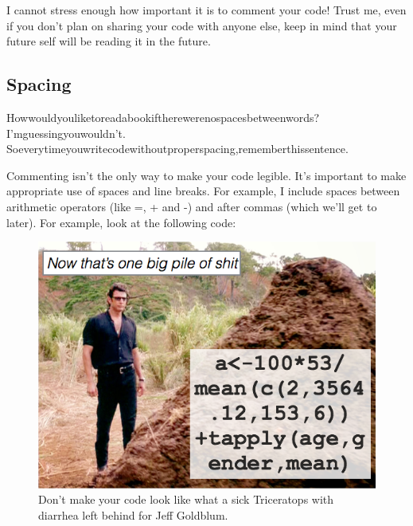 \documentclass[
]{book}
\newenvironment{Shaded}{\begin{snugshade}}{\end{snugshade}}
\newcommand{\AttributeTok}[1]{\textcolor[rgb]{0.77,0.63,0.00}{#1}}
\newcommand{\CommentTok}[1]{\textcolor[rgb]{0.56,0.35,0.01}{\textit{#1}}}
\newcommand{\FunctionTok}[1]{\textcolor[rgb]{0.00,0.00,0.00}{#1}}
\newcommand{\NormalTok}[1]{#1}
\newcommand{\SpecialCharTok}[1]{\textcolor[rgb]{0.00,0.00,0.00}{#1}}
\newcommand{\StringTok}[1]{\textcolor[rgb]{0.31,0.60,0.02}{#1}}
\begin{document}
\begin{Shaded}
\end{Shaded}

I cannot stress enough how important it is to comment your code! Trust me, even if you don't plan on sharing your code with anyone else, keep in mind that your future self will be reading it in the future.

\hypertarget{spacing}{%
\subsection{Spacing}\label{spacing}}

Howwouldyouliketoreadabookiftherewerenospacesbetweenwords?
I'mguessingyouwouldn't.
Soeverytimeyouwritecodewithoutproperspacing,rememberthissentence.

Commenting isn't the only way to make your code legible. It's important to make appropriate use of spaces and line breaks. For example, I include spaces between arithmetic operators (like =, + and -) and after commas (which we'll get to later). For example, look at the following code:

\begin{figure}

{\centering \includegraphics[width=0.5\linewidth]{images/chapter-2/pileofshit} 

}

\caption{Don't make your code look like what a sick Triceratops with diarrhea left behind for Jeff Goldblum.}\label{fig:pileofshit}
\end{figure}
\end{document}
